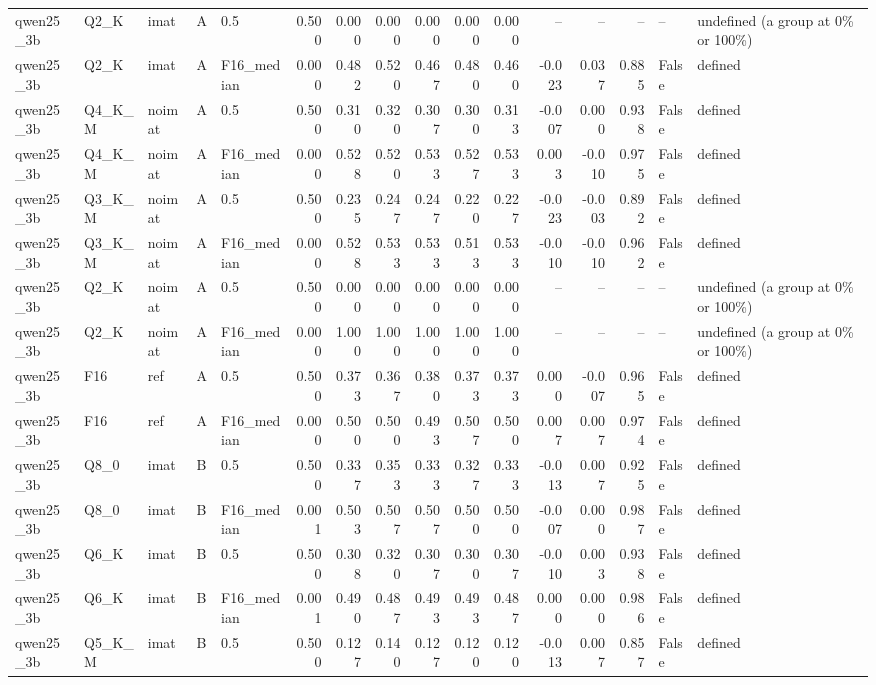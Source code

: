 \begin{tabular}{lllllrrrrrrrrrll}
qwen25\_3b & Q2\_K & imat & A & 0.5 & 0.500 & 0.000 & 0.000 & 0.000 & 0.000 & 0.000 & -- & -- & -- & -- & undefined (a group at 0\% or 100\%) \\
qwen25\_3b & Q2\_K & imat & A & F16\_median & 0.000 & 0.482 & 0.520 & 0.467 & 0.480 & 0.460 & -0.023 & 0.037 & 0.885 & False & defined \\
qwen25\_3b & Q4\_K\_M & noimat & A & 0.5 & 0.500 & 0.310 & 0.320 & 0.307 & 0.300 & 0.313 & -0.007 & 0.000 & 0.938 & False & defined \\
qwen25\_3b & Q4\_K\_M & noimat & A & F16\_median & 0.000 & 0.528 & 0.520 & 0.533 & 0.527 & 0.533 & 0.003 & -0.010 & 0.975 & False & defined \\
qwen25\_3b & Q3\_K\_M & noimat & A & 0.5 & 0.500 & 0.235 & 0.247 & 0.247 & 0.220 & 0.227 & -0.023 & -0.003 & 0.892 & False & defined \\
qwen25\_3b & Q3\_K\_M & noimat & A & F16\_median & 0.000 & 0.528 & 0.533 & 0.533 & 0.513 & 0.533 & -0.010 & -0.010 & 0.962 & False & defined \\
qwen25\_3b & Q2\_K & noimat & A & 0.5 & 0.500 & 0.000 & 0.000 & 0.000 & 0.000 & 0.000 & -- & -- & -- & -- & undefined (a group at 0\% or 100\%) \\
qwen25\_3b & Q2\_K & noimat & A & F16\_median & 0.000 & 1.000 & 1.000 & 1.000 & 1.000 & 1.000 & -- & -- & -- & -- & undefined (a group at 0\% or 100\%) \\
qwen25\_3b & F16 & ref & A & 0.5 & 0.500 & 0.373 & 0.367 & 0.380 & 0.373 & 0.373 & 0.000 & -0.007 & 0.965 & False & defined \\
qwen25\_3b & F16 & ref & A & F16\_median & 0.000 & 0.500 & 0.500 & 0.493 & 0.507 & 0.500 & 0.007 & 0.007 & 0.974 & False & defined \\
qwen25\_3b & Q8\_0 & imat & B & 0.5 & 0.500 & 0.337 & 0.353 & 0.333 & 0.327 & 0.333 & -0.013 & 0.007 & 0.925 & False & defined \\
qwen25\_3b & Q8\_0 & imat & B & F16\_median & 0.001 & 0.503 & 0.507 & 0.507 & 0.500 & 0.500 & -0.007 & 0.000 & 0.987 & False & defined \\
qwen25\_3b & Q6\_K & imat & B & 0.5 & 0.500 & 0.308 & 0.320 & 0.307 & 0.300 & 0.307 & -0.010 & 0.003 & 0.938 & False & defined \\
qwen25\_3b & Q6\_K & imat & B & F16\_median & 0.001 & 0.490 & 0.487 & 0.493 & 0.493 & 0.487 & 0.000 & 0.000 & 0.986 & False & defined \\
qwen25\_3b & Q5\_K\_M & imat & B & 0.5 & 0.500 & 0.127 & 0.140 & 0.127 & 0.120 & 0.120 & -0.013 & 0.007 & 0.857 & False & defined \\

\end{tabular}
